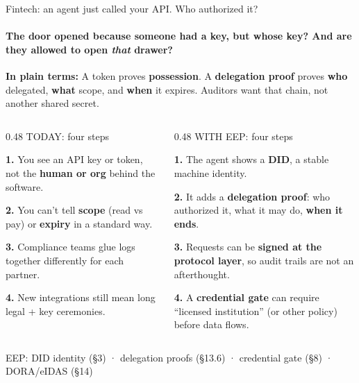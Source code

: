 \documentclass[aspectratio=169,10pt]{beamer}
\begin{document}
\begin{frame}{Fintech: an agent just called your API. Who authorized it?}
\framesubtitle{The door opened because someone had a key, but whose key? And are they allowed to open \emph{that} drawer?}

\vspace{0.08cm}
{\small\color{amber}\textbf{In plain terms:}\; A token proves \textbf{possession}. A \textbf{delegation proof} proves \textbf{who} delegated, \textbf{what} scope, and \textbf{when} it expires. Auditors want that chain, not another shared secret.}

\vspace{0.08cm}
\begin{columns}[T]
\begin{column}{0.48\textwidth}
{\small\color{rose} TODAY: four steps}\par
\vspace{2pt}
{\small\color{txtm}%
\textbf{1.}\; You see an API key or token, not the \textbf{human or org} behind the software.\par
\textbf{2.}\; You can't tell \textbf{scope} (read vs pay) or \textbf{expiry} in a standard way.\par
\textbf{3.}\; Compliance teams glue logs together differently for each partner.\par
\textbf{4.}\; New integrations still mean long legal + key ceremonies.\par
}
\end{column}

\begin{column}{0.48\textwidth}
{\small\color{mint} WITH EEP: four steps}\par
\vspace{2pt}
{\small\color{txtm}%
\textbf{1.}\; The agent shows a \textbf{DID}, a stable machine identity.\par
\textbf{2.}\; It adds a \textbf{delegation proof}: who authorized it, what it may do, \textbf{when it ends}.\par
\textbf{3.}\; Requests can be \textbf{signed at the protocol layer}, so audit trails are not an afterthought.\par
\textbf{4.}\; A \textbf{credential gate} can require ``licensed institution'' (or other policy) before data flows.\par
}
\end{column}
\end{columns}

\vspace{4pt}
{\footnotesize\color{slate} EEP: DID identity (§3) · delegation proofs (§13.6) · credential gate (§8) · DORA/eIDAS (§14)}
\end{frame}
\end{document}

